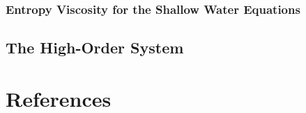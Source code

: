 \documentclass{mathnotes}
\begin{document}
  \subsubsection{Entropy Viscosity for the Shallow Water Equations}
    
\subsection{The High-Order System}
  

\section*{References}


\end{document}
